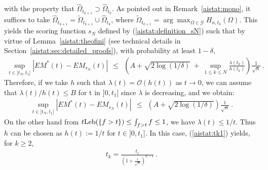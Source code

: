 with the property that $\hat \Omega_{t_{k+1}} \supset \hat \Omega_{t_k}$. As pointed out in Remark~\ref{aistat:mono}, it suffices to take $\hat \Omega_{t_{k+1}}=\tilde \Omega_{t_{k+1}} \cup \hat \Omega_{t_{k}}$, where $\tilde{\Omega}_{t_{k+1}}=\arg\max_{\Omega \in \mathcal{G}} H_{n,t_k}(\Omega)$.
This yields the scoring function $s_N$ defined by (\ref{aistat:definition_sN}) such that by virtue of Lemma~\ref{aistat:theofini} (see technical details in Section~\ref{aistat:sec:detailed_proofs}), with probability at least $1-\delta$,
\begin{align*}
\sup_{t \in ]t_N,t_1]} |EM^*(t)-EM_{s_N}(t)| ~~\le~~\left(A+\sqrt{ 2 \log(1/\delta)}~+~\sup_{1\leq k\leq N}\frac{\lambda(t_k)}{h(t_k)} \right)\frac{1}{\sqrt{n}}~. 
\end{align*}
\noindent
Therefore, if we take $h$ such that $\lambda(t) = \mathcal{O}(h(t))$
as $t \rightarrow 0$, we can assume that $\lambda(t)/h(t) \le B$ for t in $]0,t_1]$ since $\lambda$ is decreasing, and we
obtain:
\begin{align}
\label{aistat:fondineq}
\sup_{t \in ]t_N,t_1]} |EM^*(t)-EM_{s_N}(t)| ~~\le~~\left(A+\sqrt{2 \log(1/\delta)} \right)\frac{1}{\sqrt{n}}~.
\end{align}
\noindent
On the other hand from $t \text{Leb}(\{f>t\}) \le \int_{f>t} f \le 1$, we have $\lambda(t) \le 1/t$. Thus $h$ can be chosen as $h(t):=1/t$ for $t \in ]0,t_1]$. In this case, (\ref{aistat:tk1}) yields, for $k \ge 2$,
\begin{align}
\label{aistat:tk}
t_{k}=\frac{t_1}{(1+\frac{1}{\sqrt n})^{k-1}}~.
\end{align}


